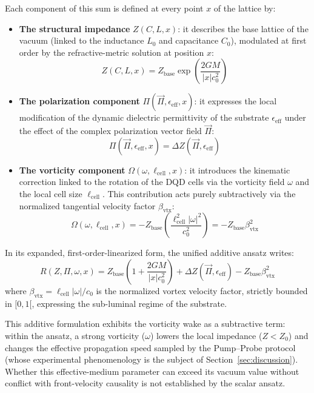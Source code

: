 \documentclass[11pt,a4paper]{article}
\theoremstyle{plain}
\theoremstyle{remark}
\begin{document}
Each component of this sum is defined at every point $x$ of the lattice by:
\begin{itemize}
    \item \textbf{The structural impedance} $Z(C, L, x)$: it describes the base lattice of the vacuum (linked to the inductance $L_0$ and capacitance $C_0$), modulated at first order by the refractive-metric solution at position $x$:
    \begin{equation}
    Z(C, L, x) = Z_{\text{base}} \exp\left(\frac{2GM}{|x|c_{0}^{2}}\right)
    \end{equation}
    \item \textbf{The polarization component} $\Pi(\vec{\Pi}, \epsilon_{\text{eff}}, x)$: it expresses the local modification of the dynamic dielectric permittivity of the substrate $\epsilon_{\text{eff}}$ under the effect of the complex polarization vector field $\vec{\Pi}$:
    \begin{equation}
    \Pi(\vec{\Pi}, \epsilon_{\text{eff}}, x) = \Delta Z(\vec{\Pi}, \epsilon_{\text{eff}})
    \end{equation}
    \item \textbf{The vorticity component} $\Omega(\omega, \ell_{\text{cell}}, x)$: it introduces the kinematic correction linked to the rotation of the DQD cells via the vorticity field $\omega$ and the local cell size $\ell_{\text{cell}}$. This contribution acts purely subtractively via the normalized tangential velocity factor $\beta_{\text{vtx}}$:
    \begin{equation}
    \Omega(\omega, \ell_{\text{cell}}, x) = - Z_{\text{base}} \left(\frac{\ell_{\text{cell}}^{2}|\omega|^{2}}{c_{0}^{2}}\right) = - Z_{\text{base}} \beta_{\text{vtx}}^{2}
    \end{equation}
\end{itemize}

In its expanded, first-order-linearized form, the unified additive ansatz writes:
\begin{equation}
\label{eq:additive_ansatz_expanded}
R(Z, \Pi, \omega, x) = Z_{\text{base}}\left(1 + \frac{2GM}{|x|c_{0}^{2}}\right) + \Delta Z(\vec{\Pi}, \epsilon_{\text{eff}}) - Z_{\text{base}}\beta_{\text{vtx}}^{2}
\end{equation}
where $\beta_{\text{vtx}} = \ell_{\text{cell}}|\omega|/c_{0}$ is the normalized vortex velocity factor, strictly bounded in $[0,1[$, expressing the sub-luminal regime of the substrate.

This additive formulation exhibits the vorticity wake as a subtractive term: within the ansatz, a strong vorticity ($\omega$) lowers the local impedance ($Z < Z_0$) and changes the effective propagation speed sampled by the Pump--Probe protocol (whose experimental phenomenology is the subject of Section~\ref{sec:discussion}). Whether this effective-medium parameter can exceed its vacuum value without conflict with front-velocity causality is not established by the scalar ansatz.
\end{document}
